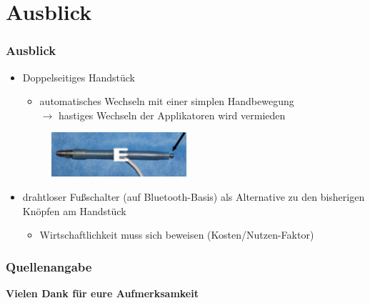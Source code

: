 \documentclass{beamer}
\begin{document}
\section{Ausblick}
\begin{frame}
\frametitle{Ausblick}
	\begin{itemize}
		\item Doppelseitiges Handstück \cite{dual}
		\begin{itemize}
			\item automatisches Wechseln mit einer simplen Handbewegung\\
			$\rightarrow$ hastiges Wechseln der Applikatoren wird vermieden		
		\end{itemize}
		\begin{figure}
			\includegraphics[width=5cm]{images/dual.png}
		\end{figure}
		\vspace{1cm}
		\item drahtloser Fußschalter (auf Bluetooth-Basis) als Alternative zu den bisherigen Knöpfen am Handstück \cite{kramme2016medizintechnik}
		\begin{itemize}
			\item Wirtschaftlichkeit muss sich beweisen (Kosten/Nutzen-Faktor)
		\end{itemize}
	\end{itemize}
\end{frame}


\begin{frame}[shrink]
\frametitle{Quellenangabe}
	
	
\end{frame}

\begin{frame}
\centering
\textbf{Vielen Dank für eure Aufmerksamkeit}
\end{frame}
\end{document}
